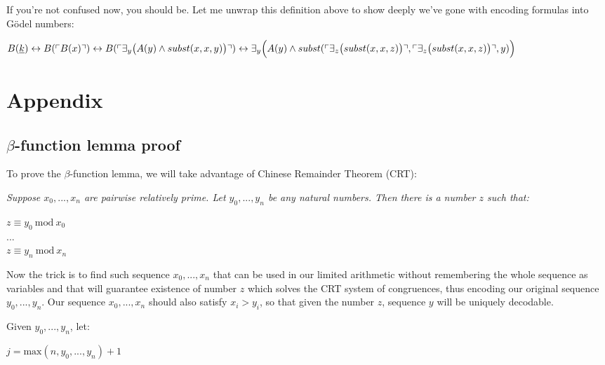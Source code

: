\documentclass{article}
\begin{document}
If you're not confused now, you should be. Let me unwrap this definition above
to show deeply we've gone with encoding formulas into Gödel numbers:

\begin{center}
    $B(\underline{k}) \leftrightarrow \\
    B(\ulcorner B(x) \urcorner) \leftrightarrow \\
    B(\ulcorner \exists_y \bigl(
        A(y) \land subst(x, x, y)
    \bigr) \urcorner) \leftrightarrow \\
    \exists_y \Bigl(
        A(y) \land subst(
            \ulcorner \exists_z \bigl(subst(x, x, z) \bigr) \urcorner,
            \ulcorner \exists_z \bigl(subst(x, x, z) \bigr) \urcorner,
            y)
    \Bigr)
    $
\end{center}

\section{Appendix}

\subsection{$\beta$-function lemma proof}

To prove the $\beta$-function lemma, we will take advantage of Chinese Remainder Theorem (CRT):

\begin{center}
    \textit{
        Suppose $x_0, ..., x_n$ are pairwise relatively prime. Let $y_0, ..., y_n$ be any natural numbers.
        Then there is a number $z$ such that:
    }

    $z \equiv y_0\ \text{mod}\ x_0$\\
    ...\\
    $z \equiv y_n\ \text{mod}\ x_n$
\end{center}

Now the trick is to find such sequence $x_0, ..., x_n$ that can be used in our limited arithmetic
without remembering the whole sequence as variables and that will guarantee existence of number $z$
which solves the CRT system of congruences, thus encoding our original sequence $y_0, ..., y_n$.
Our sequence $x_0, ..., x_n$ should also satisfy $x_i > y_i$, so that given the number $z$,
sequence $y$ will be uniquely decodable.

Given $y_0, ..., y_n$, let:

\begin{center}
    $j = \text{max}(n, y_0, ..., y_n) + 1$
\end{center}
\end{document}
